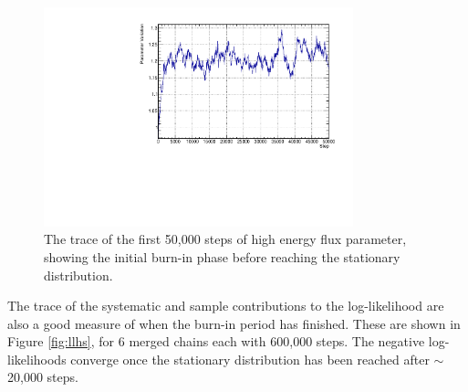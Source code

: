 \begin{figure}[!htbp]
\centering
\includegraphics*[width=0.8\textwidth,clip]{figs/burnin}
\caption{The trace of the first 50,000 steps of high energy flux parameter, showing the initial burn-in phase before reaching the stationary distribution.}\label{fig:burnin}
\end{figure}

The trace of the systematic and sample contributions to the log-likelihood are also a good measure of when the burn-in period has finished. These are shown in Figure \ref{fig:llhs}, for 6 merged chains each with 600,000 steps. The negative log-likelihoods converge once the stationary distribution has been reached after $\sim$20,000 steps.

